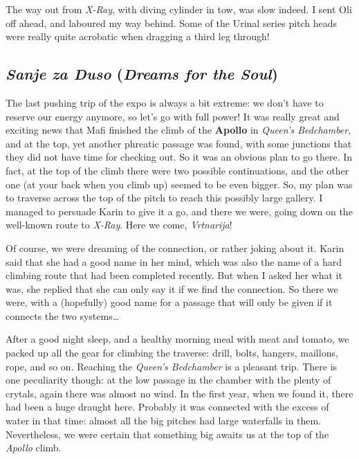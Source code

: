 The way out from \emph{X-Ray}, with diving cylinder in tow, was slow
indeed. I sent Oli off ahead, and laboured my way behind. Some of the
Urinal series pitch heads were really quite acrobatic when dragging a
third leg through!



\subsection{\texorpdfstring{\emph{Sanje za Duso} (\emph{Dreams for the
Soul})}{Sanje za Duso (Dreams for the Soul)}}

The last pushing trip of the expo is always a bit extreme: we don't have
to reserve our energy anymore, so let's go with full power! It was
really great and exciting news that Mafi finished the climb of the
\textbf{Apollo} in \emph{Queen's Bedchamber}, and at the top, yet
another phreatic passage was found, with some junctions that they did
not have time for checking out. So it was an obvious plan to go there.
In fact, at the top of the climb there were two possible continuations,
and the other one (at your back when you climb up) seemed to be even
bigger. So, my plan was to traverse across the top of the pitch to reach
this possibly large gallery. I managed to persuade Karin to give it a
go, and there we were, going down on the well-known route to
\emph{X-Ray}. Here we come, \emph{Vrtnarija}!

Of course, we were dreaming of the connection, or rather joking about
it. Karin said that she had a good name in her mind, which was also the
name of a hard climbing route that had been completed recently. But when
I asked her what it was, she replied that she can only say it if we find
the connection. So there we were, with a (hopefully) good name for a
passage that will only be given if it connects the two systems\ldots{}

After a good night sleep, and a healthy morning meal with meat and
tomato, we packed up all the gear for climbing the traverse: drill,
bolts, hangers, maillons, rope, and so on. Reaching the \emph{Queen's
Bedchamber} is a pleasant trip. There is one peculiarity though: at the
low passage in the chamber with the plenty of crytals, again there was
almost no wind. In the first year, when we found it, there had been a
huge draught here. Probably it was connected with the excess of water in
that time: almost all the big pitches had large waterfalls in them.
Nevertheless, we were certain that something big awaits us at the top of
the \emph{Apollo} climb.

